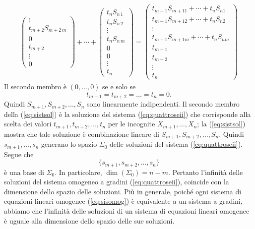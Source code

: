 \documentclass{article}
\theoremstyle{plain}
\theoremstyle{definition}
\theoremstyle{remark}
\begin{document}
\begin{equation}
\begin{aligned}
\begin{pmatrix}
        \vdots\\
        t_{m+2}S_{m+2\,m}\\
        0\\
        t_{m+2}\\
        \vdots\\
        0
    \end{pmatrix}
    +
    \cdots
    +
    \begin{pmatrix}
        t_nS_{n\,1}\\
        t_nS_{n\,2}\\
        \vdots\\
        t_nS_{n\,m}\\
        0\\
        0\\
        \vdots\\
        t_n
    \end{pmatrix}=\begin{pmatrix}
        t_{m+1}S_{m+11} + \cdots + t_{n}S_{n1}\\
        t_{m+1}S_{m+12} + \cdots + t_{n}S_{n2}\\
        \vdots\\
        t_{m+1}S_{m+1m} + \cdots + t_{n}S_{nm}\\
        t_{m+1}\\
        t_{m+2}\\
        \vdots\\
        t_{n}  
        \end{pmatrix}
\end{aligned}
\end{equation}
Il secondo membro è $(0,\ldots,0)$ se e solo se \[t_{m+1}=t_{m+2}=\dots=t_n=0.\]
Quindi $S_{m+1}, S_{m+2}, ..., S_n$ sono linearmente indipendenti.
Il secondo membro della (\ref{eq:sistsol}) è la soluzione del sistema (\ref{eq:quattroseii}) che corrisponde alla scelta dei valori $t_{m+1}, t_{m+2}, \ldots, t_n$ per le incognite $X_{m+1}, \ldots, X_n$; 
la (\ref{eq:sistsol}) mostra che tale soluzione è combinazione lineare di $S_{m+1}, S_{m+2}, \ldots, S_n$. 
Quindi \( s_{m+1}, \ldots, s_n \) generano lo spazio \( \Sigma_0 \) delle soluzioni del sistema (\ref{eq:quattroseii}). 
Segue che \[ \{s_{m+1}, s_{m+2}, \ldots, s_n\} \] è una base di \( \Sigma_0 \). 
In particolare, \( \dim(\Sigma_0) = n - m \).
Pertanto l'infinità delle soluzioni del sistema omogeneo a gradini (\ref{eq:quattroseii}), coincide con la dimensione dello spazio delle soluzioni.
Più in generale, poiché ogni sistema di equazioni lineari omogenee (\ref{eq:sisomog}) è equivalente a un sistema a gradini, abbiamo che l'infinità delle soluzioni di un sistema di equazioni lineari omogenee è uguale alla dimensione dello spazio delle sue soluzioni.
\end{document}

